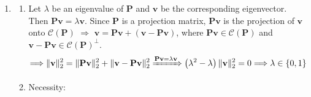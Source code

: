 \documentclass[11pt,letter,notitlepage]{article}
\DeclareMathOperator*{\argmin}{\bf argmin}
\newcommand{\proj}[2]{\textbf{P}_{#2} (#1)}
\begin{document}
\begin{solution}
\begin{enumerate}
\begin{enumerate}
\[\begin{matrix}
			1 & 0\\
			0 & 1
		\end{matrix}
		\right]
		\Longrightarrow
		\mathbf{x}
		\in
		\mathcal{C}(\mathbf{A}) = \mathbb{R}^2
		\Longrightarrow
		\proj{\mathbf{x}}{\mathbf{A}} 
		= 
		\mathbf{x}
		=
		\mathbf{A}
		\cdot
		\mathbf{x}
		\]
		The coordinates of $\mathbf{P_A}(\mathbf{x})$ with respect to the column vectors in $\mathbf{A}$ are unique and equal to $\mathbf{x}$ itself.
		\item
		\[
		\mathbf{A} = \left[
		\begin{matrix}
			1 & 2\\
			1 & 2
		\end{matrix}
		\right]
		\Longrightarrow
		\mathcal{C}(\mathbf{A}) = \{\alpha (1,1)^T : \alpha \in \mathbb{R}\}
		\]
		\[
		\proj{\mathbf{x}}{\mathbf{A}}
		=
		\argmin_{\substack{\alpha (1,1)^T \\ \alpha \in \mathbb{R}}} \Vert \mathbf{x} - \alpha (1,1)^T \Vert_2
		\]
		\[
		\xrightarrow{2.(a)}
		\proj{\mathbf{x}}{\mathbf{A}}
		=
		\frac{(1,1)\mathbf{x}}{(1,1)(1,1)^T}(1,1)^T
		=
		\frac{x_1 + x_2}{2}(1,1)^T
		=
		\mathbf{A}
		\cdot
		\left(c_1, c_2\right)^T
		\]
		$\Longrightarrow$ The set of all coordinates of $\mathbf{P_A}(\mathbf{x})$ with respect to the column vectors in $\mathbf{A}$ is the affine line:
		\[
		\left\{(c_1, c_2)^T \in \mathbb{R}^2 : c_1 + 2c_2 = \frac{x_1 + x_2}{2}\right\}
		\]
		Thus the coordinates are not unique.	
	\end{enumerate}
	\item 
	\begin{enumerate}
		\item 
		Let $\lambda$ be an eigenvalue of $\mathbf{P}$ and $\mathbf{v}$ be the corresponding eigenvector. Then $\mathbf{P}\mathbf{v} = \lambda \mathbf{v}$. Since $\mathbf{P}$ is a projection matrix, $\mathbf{P}\mathbf{v}$ is the projection of $\mathbf{v}$ onto $\mathcal{C}(\mathbf{P})$ $\Longrightarrow$ $\mathbf{v} = \mathbf{P}\mathbf{v} + \left(\mathbf{v} - \mathbf{P}\mathbf{v}\right)$, where $\mathbf{P}\mathbf{v} \in \mathcal{C}(\mathbf{P})$ and $\mathbf{v} - \mathbf{P}\mathbf{v} \in \mathcal{C}(\mathbf{P})^{\perp}$.
		\[
		\Longrightarrow
		\Vert \mathbf{v} \Vert_2^2
		=
		\Vert \mathbf{Pv} \Vert_2^2
		+
		\Vert \mathbf{v} - \mathbf{Pv} \Vert_2^2
		\xRightarrow{\mathbf{Pv} = \lambda \mathbf{v}}
		\left(\lambda^2-\lambda\right)\Vert \mathbf{v} \Vert_2^2
		=
		0
		\Longrightarrow
		\lambda \in \{0, 1\}
		\]
		\item
		 Necessity:


\end{enumerate}
\end{enumerate}
\end{solution}
\end{document}
